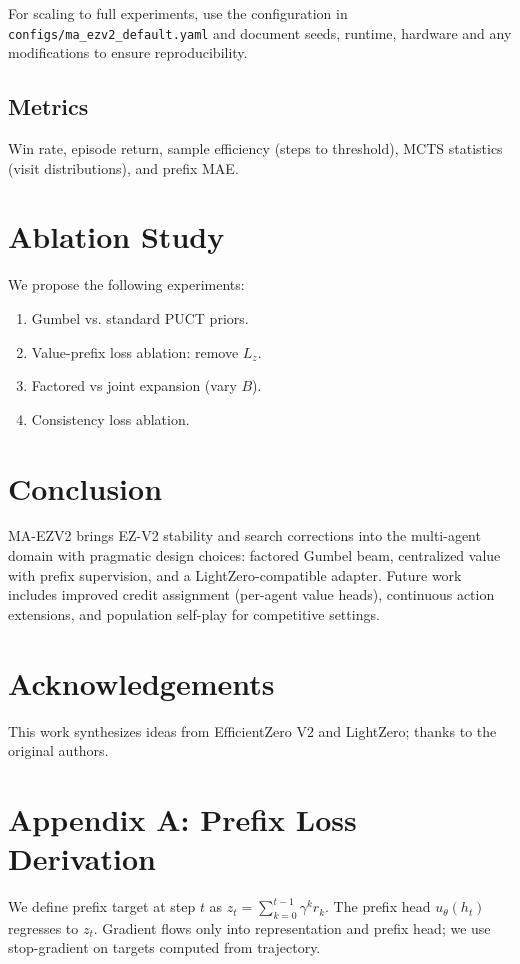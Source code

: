 \documentclass{article}
\begin{document}
For scaling to full experiments, use the configuration in \texttt{configs/ma_ezv2_default.yaml} and document seeds, runtime, hardware and any modifications to ensure reproducibility.
\subsection{Metrics}
Win rate, episode return, sample efficiency (steps to threshold), MCTS statistics (visit distributions), and prefix MAE.

\section{Ablation Study}
We propose the following experiments:
\begin{enumerate}
  \item Gumbel vs. standard PUCT priors.
  \item Value-prefix loss ablation: remove $L_z$.
  \item Factored vs joint expansion (vary $B$).
  \item Consistency loss ablation.
\end{enumerate}

\section{Conclusion}
MA-EZV2 brings EZ-V2 stability and search corrections into the multi-agent domain with pragmatic design choices: factored Gumbel beam, centralized value with prefix supervision, and a LightZero-compatible adapter. Future work includes improved credit assignment (per-agent value heads), continuous action extensions, and population self-play for competitive settings.

\section*{Acknowledgements}
This work synthesizes ideas from EfficientZero V2 and LightZero; thanks to the original authors.




\appendix
\section{Appendix A: Prefix Loss Derivation}
We define prefix target at step $t$ as $z_t=\sum_{k=0}^{t-1}\gamma^k r_k$. The prefix head $u_\theta(h_t)$ regresses to $z_t$. Gradient flows only into representation and prefix head; we use stop-gradient on targets computed from trajectory.
\end{document}
